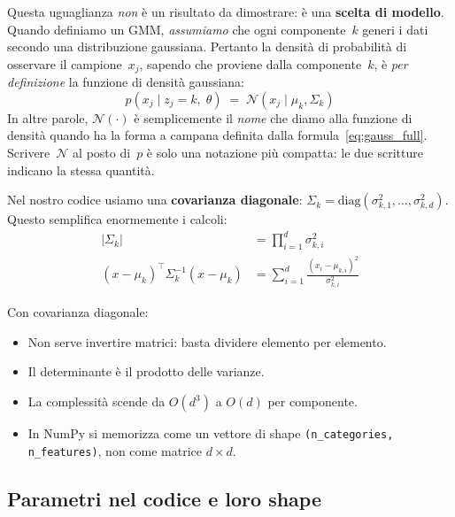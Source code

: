 \documentclass[11pt,a4paper]{article}
\begin{document}
\begin{infobox}[Perch\'{e} $p(x_j \mid \mu_k, \Sigma_k) = \mathcal{N}(x_j \mid \mu_k, \Sigma_k)$?]
Questa uguaglianza \emph{non} \`{e} un risultato da dimostrare: \`{e} una
\textbf{scelta di modello}.  Quando definiamo un GMM, \emph{assumiamo} che
ogni componente~$k$ generi i dati secondo una distribuzione gaussiana.
Pertanto la densit\`{a} di probabilit\`{a} di osservare il campione~$x_j$,
sapendo che proviene dalla componente~$k$, \`{e} \emph{per definizione} la
funzione di densit\`{a} gaussiana:
\[
  p(x_j \mid z_j = k,\;\theta)
  \;=\;
  \mathcal{N}(x_j \mid \mu_k, \Sigma_k)
\]
In altre parole, $\mathcal{N}(\cdot)$ \`{e} semplicemente il \emph{nome}
che diamo alla funzione di densit\`{a} quando ha la forma a campana
definita dalla formula~\eqref{eq:gauss_full}.
Scrivere~$\mathcal{N}$ al posto di~$p$ \`{e} solo una notazione pi\`{u}
compatta: le due scritture indicano la stessa quantit\`{a}.
\end{infobox}

Nel nostro codice usiamo una \textbf{covarianza diagonale}:
$\Sigma_k = \mathrm{diag}(\sigma_{k,1}^2, \ldots, \sigma_{k,d}^2)$.
Questo semplifica enormemente i calcoli:
\begin{align}
  |\Sigma_k| &= \prod_{i=1}^{d} \sigma_{k,i}^2 \label{eq:det}\\
  (x-\mu_k)^\top \Sigma_k^{-1} (x-\mu_k) &=
  \sum_{i=1}^{d} \frac{(x_i - \mu_{k,i})^2}{\sigma_{k,i}^2}
  \label{eq:mahal}
\end{align}

\begin{tipbox}
Con covarianza diagonale:
\begin{itemize}[nosep]
  \item Non serve invertire matrici: basta dividere elemento per elemento.
  \item Il determinante è il prodotto delle varianze.
  \item La complessità scende da $O(d^3)$ a $O(d)$ per componente.
  \item In NumPy si memorizza come un vettore di shape
        \texttt{(n\_categories, n\_features)}, non come matrice $d\times d$.
\end{itemize}
\end{tipbox}

\subsection{Parametri nel codice e loro shape}
\end{document}
